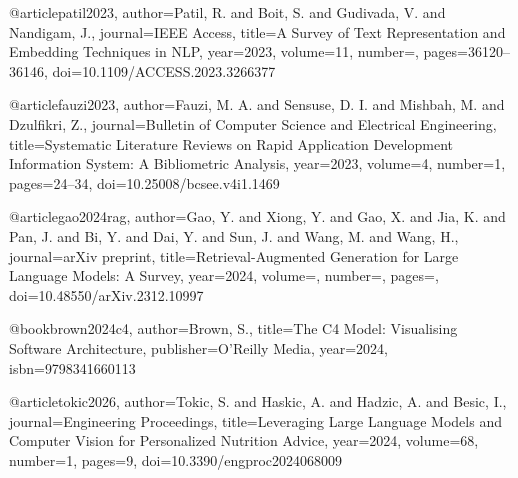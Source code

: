 @article{patil2023,
  author={Patil, R. and Boit, S. and Gudivada, V. and Nandigam, J.},
  journal={IEEE Access},
  title={A Survey of Text Representation and Embedding Techniques in {NLP}},
  year={2023},
  volume={11},
  number={},
  pages={36120--36146},
  doi={10.1109/ACCESS.2023.3266377}
}

@article{fauzi2023,
  author={Fauzi, M. A. and Sensuse, D. I. and Mishbah, M. and Dzulfikri, Z.},
  journal={Bulletin of Computer Science and Electrical Engineering},
  title={Systematic Literature Reviews on Rapid Application Development Information System: A Bibliometric Analysis},
  year={2023},
  volume={4},
  number={1},
  pages={24--34},
  doi={10.25008/bcsee.v4i1.1469}
}

@article{gao2024rag,
  author={Gao, Y. and Xiong, Y. and Gao, X. and Jia, K. and Pan, J. and Bi, Y. and Dai, Y. and Sun, J. and Wang, M. and Wang, H.},
  journal={arXiv preprint},
  title={Retrieval-Augmented Generation for Large Language Models: A Survey},
  year={2024},
  volume={},
  number={},
  pages={},
  doi={10.48550/arXiv.2312.10997}
}

@book{brown2024c4,
  author={Brown, S.},
  title={The C4 Model: Visualising Software Architecture},
  publisher={O'Reilly Media},
  year={2024},
  isbn={9798341660113}
}

@article{tokic2026,
  author={Tokic, S. and Haskic, A. and Hadzic, A. and Besic, I.},
  journal={Engineering Proceedings},
  title={Leveraging Large Language Models and Computer Vision for Personalized Nutrition Advice},
  year={2024},
  volume={68},
  number={1},
  pages={9},
  doi={10.3390/engproc2024068009}
}